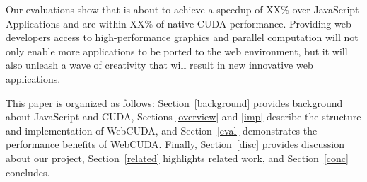 Our evaluations show that \name is about to achieve a speedup of XX\% over
JavaScript Applications and are within XX\% of native CUDA performance.
Providing web developers access to high-performance graphics and
parallel computation will not only enable more applications to be ported to the
web environment, but it will also unleash a wave of creativity that will result
in new innovative web applications.

This paper is organized as follows: Section~\ref{background} provides background about JavaScript and CUDA, 
Sections \ref{overview} and \ref{imp} describe the structure and implementation of WebCUDA, and
Section~\ref{eval} demonstrates the performance benefits of WebCUDA. Finally, Section~\ref{disc}
provides discussion about our project, Section~\ref{related} highlights related
work, and Section~\ref{conc} concludes.

